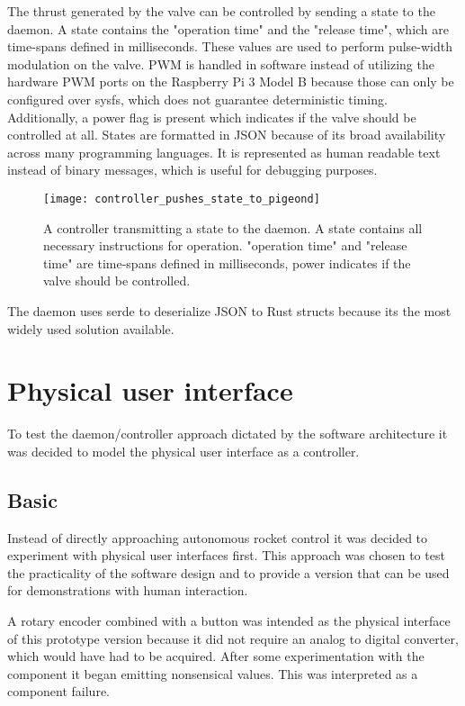 The thrust generated by the valve can be controlled by sending a state to the daemon. A state contains the "operation time" and the "release time", which are time-spans defined in milliseconds. These values are used to perform pulse-width modulation on the valve. PWM is handled in software instead of utilizing the hardware PWM ports on the Raspberry Pi 3 Model B because those can only be configured over sysfs, which does not guarantee deterministic timing. Additionally, a power flag is present which indicates if the valve should be controlled at all. States are formatted in JSON \cite{json} because of its broad availability across many programming languages. It is represented as human readable text instead of binary messages, which is useful for debugging purposes. 

\begin{figure}[h]
\centering

\texttt{[image: controller\_pushes\_state\_to\_pigeond]}

\caption{A controller transmitting a state to the daemon. A state contains all necessary instructions for operation. "operation time" and "release time" are time-spans defined in milliseconds, power indicates if the valve should be controlled.}
\end{figure}

The daemon uses serde \cite{serde} to deserialize JSON to Rust structs because its the most widely used solution available.

\section{Physical user interface}
\author{Sebastian Schaffler}

To test the daemon/controller approach dictated by the software architecture it was decided to model the physical user interface as a controller.

\subsection{Basic}
Instead of directly approaching autonomous rocket control it was decided to experiment with physical user interfaces first. This approach was chosen to test the practicality of the software design and to provide a version that can be used for demonstrations with human interaction. 

A rotary encoder \cite{rotary-encoder} combined with a button was intended as the physical interface of this prototype version because it did not require an analog to digital converter, which would have had to be acquired. After some experimentation with the component it began emitting nonsensical values. This was interpreted as a component failure. 

